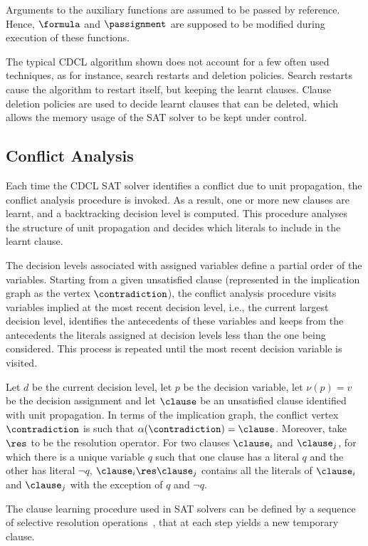 Arguments to the auxiliary functions are assumed to be passed by reference.
Hence, $\formula$ and $\passignment$ are supposed to be modified during execution
of these functions.

The typical CDCL algorithm shown does not account for a few often used
techniques, as for instance, search restarts and deletion policies. Search
restarts cause the algorithm to restart itself, but keeping the learnt clauses.
Clause deletion policies are used to decide learnt clauses that can be deleted,
which allows the memory usage of the SAT solver to be kept under control.

\subsection{Conflict Analysis}%
\label{sec:conflictanalysis}

Each time the CDCL SAT solver identifies a conflict due to unit propagation, the
conflict analysis procedure is invoked. As a result, one or more new clauses are
learnt, and a backtracking decision level is computed. This procedure analyses
the structure of unit propagation and decides which literals to include in the
learnt clause.

The decision levels associated with assigned variables define a partial order of
the variables. Starting from a given unsatisfied clause (represented in the
implication graph as the vertex $\contradiction$), the conflict analysis
procedure visits variables implied at the most recent decision level, i.e., the
current largest decision level, identifies the antecedents of these variables
and keeps from the antecedents the literals assigned at decision levels less
than the one being considered. This process is repeated until the most recent
decision variable is visited.

Let $d$ be the current decision level, let $p$ be the decision variable, let
$\nu(p) = v$ be the decision assignment and let $\clause$ be an unsatisfied
clause identified with unit propagation. In terms of the implication graph, the
conflict vertex $\contradiction$ is such that $\alpha(\contradiction) = \clause$. Moreover, take
$\res$ to be the resolution operator. For two clauses $\clause_i$ and
$\clause_j$, for which there is a unique variable $q$ such that one clause has a
literal $q$ and the other has literal $\neg q$, $\clause_i \res \clause_j$
contains all the literals of $\clause_i$ and $\clause_j$ with the exception of
$q$ and $\neg q$.

The clause learning procedure used in SAT solvers can be defined by a sequence
of selective resolution operations~\cite{journals/corr/abs-1107-0044,DAC00*675},
that at each step yields a new temporary clause. 

